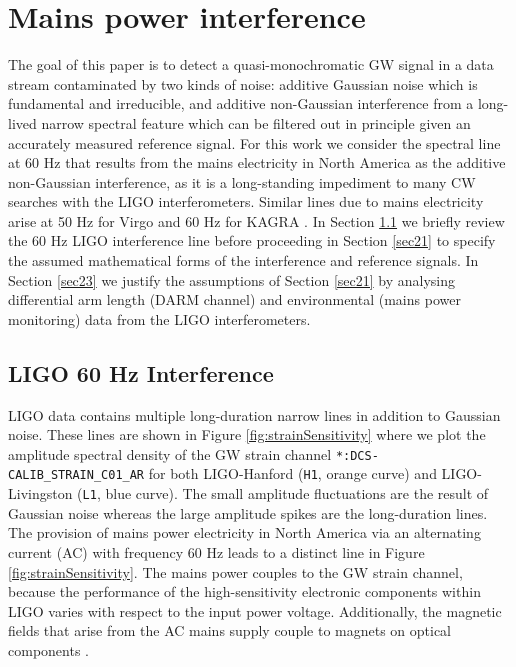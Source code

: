 \documentclass[pra,superscriptaddress,reprint,amsmath,amssymb,nofootinbib]{revtex4-2}
\begin{document}
\section{Mains power interference} \label{sec:pgi}
The goal of this paper is to detect a quasi-monochromatic GW signal in a data stream contaminated by two kinds of noise: additive Gaussian noise which is fundamental and irreducible, and additive non-Gaussian interference from a long-lived narrow spectral feature which can be filtered out in principle given an accurately measured reference signal. For this work we consider the spectral line at 60 Hz that results from the mains electricity in North America as the additive non-Gaussian interference, as it is a long-standing impediment to many CW searches with the LIGO interferometers. Similar lines due to mains electricity arise at 50 Hz for Virgo \citep{Virgo2012_lines} and 60 Hz for KAGRA \citep{Kagra2023_lines}. In Section \ref{sec22} we briefly review the 60 Hz LIGO interference line before proceeding in Section \ref{sec21} to specify the assumed mathematical forms of the interference and reference signals. In Section \ref{sec23} we justify the assumptions of Section \ref{sec21} by analysing differential arm length (DARM channel) and environmental (mains power monitoring) data from the LIGO interferometers. 


\subsection{LIGO 60 Hz Interference}  \label{sec22}

LIGO data contains multiple long-duration narrow lines in addition to Gaussian noise. These lines are shown in Figure \ref{fig:strainSensitivity} where we plot the amplitude spectral density of the GW strain channel \texttt{*:DCS-CALIB\_STRAIN\_C01\_AR} for both LIGO-Hanford (\texttt{H1}, orange curve) and LIGO-Livingston (\texttt{L1}, blue curve). The small amplitude fluctuations are the result of Gaussian noise whereas the large amplitude spikes are the long-duration lines. The provision of mains power electricity in North America via an alternating current (AC) with frequency 60 Hz leads to a distinct line in Figure  \ref{fig:strainSensitivity}. The mains power couples to the GW strain channel, because the performance of the high-sensitivity electronic components within LIGO varies with respect to the input power voltage. Additionally, the magnetic fields that arise from the AC mains supply couple to magnets on optical components \citep{CovasEtAl:2018}. \newline 
\end{document}
